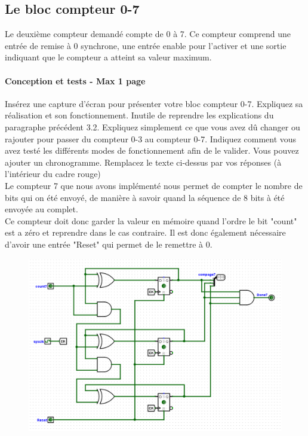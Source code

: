 \documentclass[a4paper]{article} %
\begin{document}
\subsection{Le bloc compteur 0-7}
Le deuxième compteur demandé compte de 0 à 7. Ce compteur comprend une entrée de remise à 0 synchrone, une entrée enable pour l’activer et une sortie indiquant que le compteur a atteint sa valeur maximum.

\begin{tcolorbox}[colframe=Monokaimagenta,colback=white, breakable, enhanced]
\paragraph{Conception et tests - Max 1 page}
Insérez une capture d’écran pour présenter votre bloc compteur 0-7. Expliquez sa réalisation et son fonctionnement. Inutile de reprendre les explications du paragraphe précédent 3.2. Expliquez simplement ce que vous avez dû changer ou rajouter pour passer du compteur 0-3 au compteur 0-7.
Indiquez comment vous avez testé les différents modes de fonctionnement afin de le valider. Vous pouvez ajouter un chronogramme.
Remplacez le texte ci-dessus par vos réponses (à l’intérieur du cadre rouge)\\

Le compteur 7 que nous avons implémenté nous permet de compter le nombre de bits qui on été envoyé, de manière à savoir quand la séquence de 8 bits à été envoyée au complet.\\
Ce compteur doit donc garder la valeur en mémoire quand l'ordre le bit "count" est a zéro et reprendre dans le cas contraire. Il est donc également nécessaire d'avoir une entrée "Reset" qui permet de le remettre à 0.\\
\begin{figure}[H]
	\centering
	\includegraphics[width=\textwidth]{src/CPT_07}
	\label{fig:CPT_07}
\end{figure}
	

\end{tcolorbox}
\end{document}
